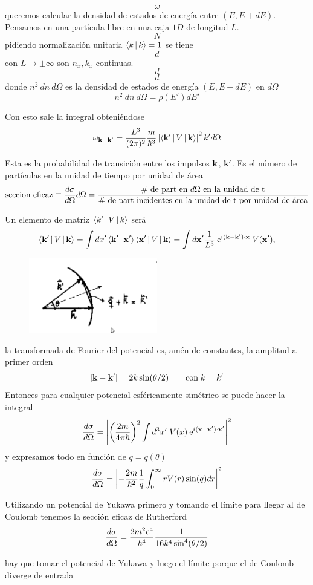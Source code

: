 \documentclass[10pt,oneside]{CBFT_book}
\begin{document}
\[
	\omega 
\]
queremos calcular la densidad de estados de energía entre $(E,E+dE)$. Pensamos en una partícula libre en una 
caja $1D$ de longitud $L$.
\[
	N
\]
pidiendo normalización unitaria $\Braket{k|k}=1$ se tiene 
\[
	d
\]
con $L\to\pm\infty$ son $n_x,k_x$ continuas.
\[
	d
\]
\[
	d
\]
donde $n^2\:dn\:d\Omega$ es la densidad de estados de energía $(E,E+dE)$ en $d\Omega$
\[
	n^2 \: dn \: d\Omega = \rho(E') dE'
\]

Con esto sale la integral obteniéndose
\[
	\omega_{\vb{k}-\vb{k}'} = 
	\frac{L^3}{(2\pi)^2} \frac{m}{\hbar^3} \left|\Braket{\vb{k}'|V|\vb{k}}\right|^2 k'd\Omega
\]

Esta es la probabilidad de transición entre los impulsos $\vb{k}$, $\vb{k}'$. Es el número de partículas en 
la unidad de tiempo por unidad de área 
\[
	\text{seccion eficaz} \equiv \frac{d^{\hspace{-0.05em}} {\sigma}}{d {\Omega}^{\hspace{-0.05em}}}d\Omega =
	\frac{\text{\# de part en $d\Omega$ en la unidad de t}}
	{\text{\# de part incidentes en la unidad de t por unidad de área}}
\]

Un elemento de matriz $\Braket{k'|V|k}$ será 
\[
	\Braket{\vb{k}'|V|\vb{k}} = \int dx'\Braket{\vb{k}'|\vb{x}'} \Braket{\vb{x}'|V|\vb{k}} =
	\int d\vb{x}' \frac{1}{L^3} \euler^{i (\vb{k}-\vb{k}')\cdot \vb{x}} \; V(\vb{x}'),
\]
\begin{figure}[htb]
	\begin{center}
	\includegraphics[width=0.5\textwidth]{images/teo2_31.pdf}
	\end{center}
	\caption{}
\end{figure} 
la transformada de Fourier del potencial es, amén de constantes, la amplitud a primer orden 
\[
	|\vb{k} - \vb{k}'| = 2k\sin(\theta/2) \qquad \text{con} \; k=k' 
\]
Entonces para cualquier potencial esféricamente simétrico se puede hacer la integral 
\[
	\dtot{\sigma}{\Omega} =
	\left|\left( \frac{2m}{4\pi\hbar}\right)^2 \int d^3x'\;V(x)\euler^{i(\vb{x}-\vb{x}')\cdot\vb{x}'}\right|^2
\]
y expresamos todo en función de $q=q(\theta)$
\[
	\frac{d^{\hspace{-0.05em}} {\sigma}}{d {\Omega}^{\hspace{-0.05em}}} =
	\left| -\frac{2m}{\hbar^2} \frac{1}{q} \int_0^\infty rV(r)\sin(q) dr \right|^2
\]

Utilizando un potencial de Yukawa primero y tomando el límite para llegar al de Coulomb tenemos la sección 
eficaz de Rutherford 
\[
	\frac{d^{\hspace{-0.05em}} {\sigma}}{d {\Omega}^{\hspace{-0.05em}}} = \frac{2m^2e^4}{\hbar^4}\frac{1}{16k^4\sin^4(\theta/2)}
\]

hay que tomar el potencial de Yukawa y luego el límite porque el de Coulomb diverge de entrada



\end{document}
